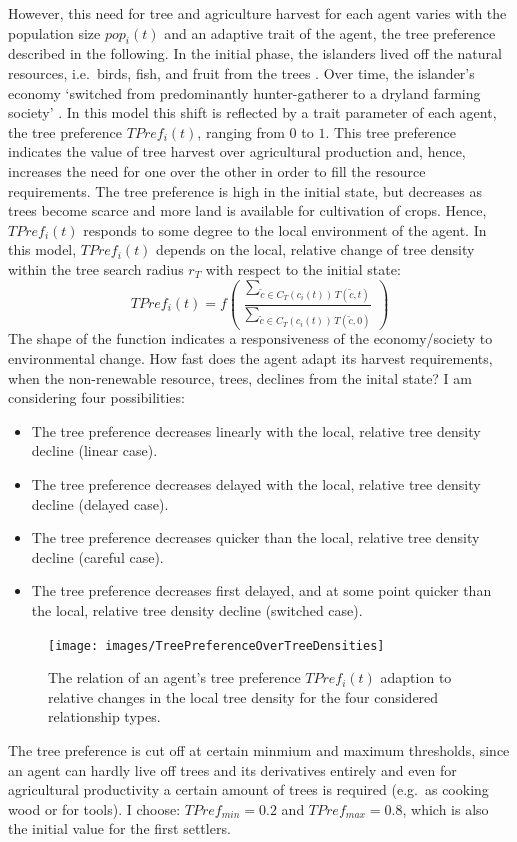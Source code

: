 However, this need for tree and agriculture harvest for each agent varies with the population size $pop_i(t)$ and an adaptive trait of the agent, the tree preference described in the following. 
In the initial phase, the islanders lived off the natural resources, i.e.\ birds, fish, and fruit from the trees \citet{Bahn2017}. 
Over time, the islander's economy `switched from predominantly hunter-gatherer to a dryland farming society' \citep{Louwagie2006}.
In this model this shift is reflected by a trait parameter of each agent, the tree preference $TPref_i(t)$, ranging from $0$ to $1$.
This tree preference indicates the value of tree harvest over agricultural production and, hence, increases the need for one over the other in order to fill the resource requirements.
The tree preference is high in the initial state, but decreases as trees become scarce and more land is available for cultivation of crops.
Hence, $TPref_i(t)$ responds to some degree to the local environment of the agent.
In this model, $TPref_i(t)$ depends on the local, relative change of tree density within the tree search radius $r_T$ with respect to the initial state:
\begin{equation}
	TPref_i(t) = f\left( \, \frac{\sum_{\tilde{c} \in C_{T}(c_i(t)) \, T(\tilde{c}, t)}}{\sum_{\tilde{c} \in C_{T}(c_i(t)) \, T(\tilde{c}, 0)} } \, \right)
\end{equation}
The shape of the function indicates a responsiveness of the economy/society to environmental change. How fast does the agent adapt its harvest requirements, when the non-renewable resource, trees, declines from the inital state?  
I am considering four possibilities: 
\begin{itemize}
\item The tree preference decreases linearly with the local, relative tree density decline (linear case).  
\item The tree preference decreases delayed with the local, relative tree density decline (delayed case).
\item The tree preference decreases quicker than the local, relative tree density decline (careful case).
\item The tree preference decreases first delayed, and at some point quicker than the local, relative tree density decline (switched case).
\end{itemize}
\begin{figure}
	\centering
	\texttt{[image: images/TreePreferenceOverTreeDensities]}
	\caption{The relation of an agent's tree preference $TPref_i(t)$ adaption to relative changes in the local tree density for the four considered relationship types.}
	\label{fig:TPref_T}
\end{figure}
The tree preference is cut off at certain minmium and maximum thresholds, since an agent can hardly live off trees and its derivatives entirely and even for agricultural productivity a certain amount of trees is required (e.g.\ as cooking wood or for tools). 
I choose: $TPref_{min} = 0.2$ and $TPref_{max} = 0.8$, which is also the initial value for the first settlers.

